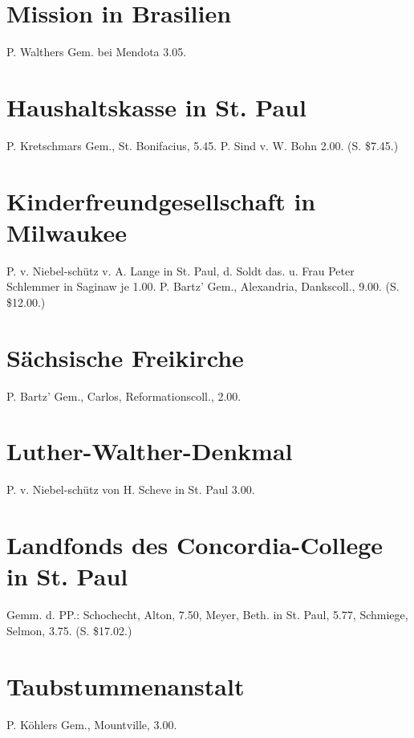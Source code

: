 \section{Mission in Brasilien}
P. Walthers Gem. bei Mendota 3.05.

\section{Haushaltskasse in St. Paul}
P. Kretschmars Gem., St. Bonifacius, 5.45. P. Sind v. W. Bohn 2.00. (S. \$7.45.)

\section{Kinderfreundgesellschaft in Milwaukee}
P. v. Niebel-schütz v. A. Lange in St. Paul, d. Soldt das. u. Frau Peter Schlemmer in Saginaw je 1.00. P. Bartz’ Gem., Alexandria, Dankscoll., 9.00. (S. \$12.00.)

\section{Sächsische Freikirche}
P. Bartz’ Gem., Carlos, Reformationscoll., 2.00.

\section{Luther-Walther-Denkmal}
P. v. Niebel-schütz von H. Scheve in St. Paul 3.00.

\section{Landfonds des Concordia-College in St. Paul}
Gemm. d. PP.: Schochecht, Alton, 7.50, Meyer, Beth. in St. Paul, 5.77, Schmiege, Selmon, 3.75. (S. \$17.02.)

\section{Taubstummenanstalt}
P. Köhlers Gem., Mountville, 3.00.

